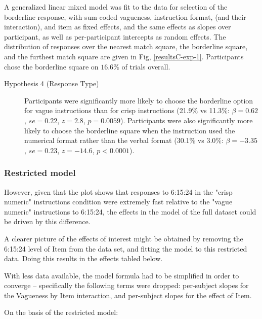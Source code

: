 A generalized linear mixed model \citet{jaeger2008categorical} was fit to the data for selection of the borderline response, with sum-coded vagueness, instruction format, (and their interaction), and item as fixed effects, and the same effects as slopes over participant, as well as per-participant intercepts as random effects. The distribution of responses over the nearest match square, the borderline square, and the furthest match square are given in Fig, \ref{resultsC-exp-1}. Participants chose the borderline square on $16.6\%$ of trials overall.

\begin{description}
\item [Hypothesis 4 (Response Type)] Participants were significantly more likely to choose the borderline option for vague instructions than for crisp instructions (21.9\% vs 11.3\%: $\beta=0.62$, $se=0.22$, $z=2.8$, $p=0.0059$). Participants were also significantly more likely to choose the borderline square when the instruction used the numerical format rather than the verbal format (30.1\% vs 3.0\%: $\beta=-3.35$, $se=0.23$, $z=-14.6$, $p<0.0001$). 
\end{description}

\subsubsection{Restricted model}

However, given that the plot shows that responses to 6:15:24 in the "crisp numeric" instructions condition were extremely fast relative to the "vague numeric" instructions to 6:15:24, the effects in the model of the full dataset could be driven by this difference. 

A clearer picture of the effects of interest might be obtained by removing the 6:15:24 level of Item from the data set, and fitting the model to this restricted data. Doing this results in the effects tabled below. 

With less data available, the model formula had to be simplified in order to converge -- specifically the following terms were dropped: per-subject slopes for the Vagueness by Item interaction, and per-subject slopes for the effect of Item.

On the basis of the restricted model:

